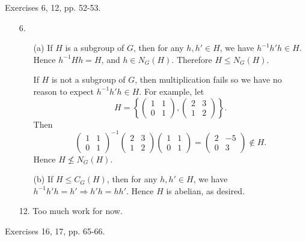 \documentclass[12pt]{article}
\theoremstyle{remark}
\theoremstyle{named}
\renewcommand{\implies}{\Rightarrow}
\begin{document}
Exercises 6, 12, pp. 52-53.

\begin{enumerate}
    \item [6.]
    \begin{enumerate}
        \item [(a)] If \(H\) is a subgroup of \(G\), then for any \(h, h' \in H\), we have \(h^{-1}h'h \in H\). Hence \(h^{-1}Hh = H\), and \(h \in N_G(H)\). Therefore \(H \le N_G(H)\). 
        
        If \(H\) is not a subgroup of \(G\), then multiplication fails so we have no reason to expect \(h^{-1}h'h \in H\). For example, let 
        \[H = \left\{\begin{pmatrix}
            1 & 1 \\ 0 & 1
        \end{pmatrix}, \begin{pmatrix}
            2 & 3 \\ 1 & 2
        \end{pmatrix}\right\}.\]
    Then 
    \[\begin{pmatrix}
        1 & 1 \\ 0 & 1
    \end{pmatrix}^{-1} \begin{pmatrix}
        2 & 3 \\ 1 & 2
    \end{pmatrix} \begin{pmatrix}
        1 & 1 \\ 0 & 1
    \end{pmatrix} = \begin{pmatrix}
        2 & -5 \\ 0 & 3
    \end{pmatrix} \notin H.\]
    Hence \(H \nleq N_G(H)\).

    \item [(b)] If \(H \le C_G(H)\), then for any \(h, h' \in H\), we have \(h^{-1}h'h = h' \implies h'h = h h'\). Hence \(H\) is abelian, as desired.
    \end{enumerate}
    \item [12.] Too much work for now.
\end{enumerate}

Exercises 16, 17, pp. 65-66.
\end{document}
